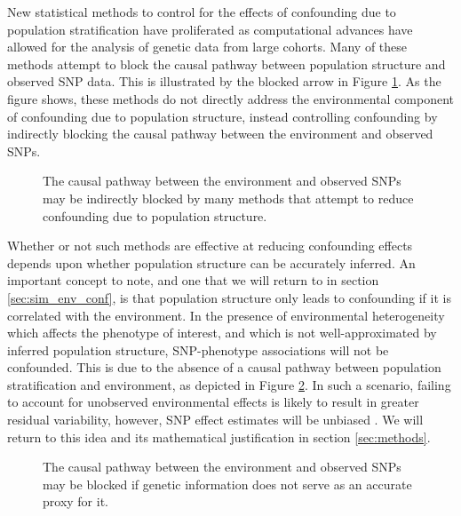 New statistical methods to control for the effects of confounding due to population stratification have proliferated as computational advances have allowed for the analysis of genetic data from large cohorts. Many of these methods attempt to block the causal pathway between population structure and observed SNP data. This is illustrated by the blocked arrow in Figure \ref{fig:ps_env_block}. As the figure shows, these methods do not directly address the environmental component of confounding due to population structure, instead controlling confounding by indirectly blocking the causal pathway between the environment and observed SNPs. 

\begin{figure}[H]
\centering
{}
\caption{The causal pathway between the environment and observed SNPs may be indirectly blocked by many methods that attempt to reduce confounding due to population structure.}
\label{fig:ps_env_block}
\end{figure}

Whether or not such methods are effective at reducing confounding effects depends upon whether population structure can be accurately inferred. An important concept to note, and one that we will return to in section \ref{sec:sim_env_conf}, is that population structure only leads to confounding if it is correlated with the environment.
In the presence of environmental heterogeneity which affects the phenotype of interest, and which is not well-approximated by inferred population structure, SNP-phenotype associations will not be confounded. This is due to the absence of a causal pathway between population stratification and environment, as depicted in Figure \ref{fig:ps_env_block2}. In such a scenario, failing to account for unobserved environmental effects is likely to result in greater residual variability, however, SNP effect estimates will be unbiased \citep{greenland1999causal}. We will return to this idea and its mathematical justification in section \ref{sec:methods}. 

\begin{figure}[H]
\centering
{}
\caption{The causal pathway between the environment and observed SNPs may be blocked if genetic information does not serve as an accurate proxy for it.}
\label{fig:ps_env_block2}
\end{figure}

